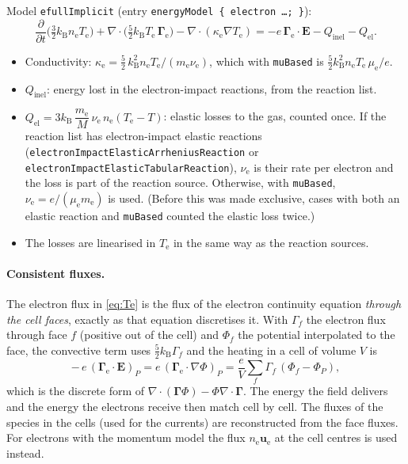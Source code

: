 \documentclass[11pt,a4paper]{article}
\newcommand{\kw}[1]{\texttt{#1}}
\newcommand{\bG}{\boldsymbol{\Gamma}}
\newcommand{\bE}{\mathbf{E}}
\newcommand{\bu}{\mathbf{u}}
\newcommand{\kB}{k_\mathrm{B}}
\newcommand{\Te}{T_\mathrm{e}}
\newcommand{\nel}{n_\mathrm{e}}
\newcommand{\pd}[2]{\frac{\partial #1}{\partial #2}}
\begin{document}
Model \kw{efullImplicit} (entry \kw{energyModel \{ electron \dots; \}}):
\begin{equation}
\pd{}{t}\Big(\tfrac32 \kB \nel \Te\Big)
 + \nabla\cdot\Big(\tfrac52 \kB \Te\,\bG_\mathrm{e}\Big)
 - \nabla\cdot(\kappa_\mathrm{e}\nabla\Te)
 = -e\,\bG_\mathrm{e}\cdot\bE - Q_\mathrm{inel} - Q_\mathrm{el} .
\label{eq:Te}
\end{equation}
\begin{itemize}
\item Conductivity: $\kappa_\mathrm{e} = \tfrac52\,\kB^2 \nel \Te/(m_\mathrm{e}\nu_\mathrm{e})$,
      which with \kw{muBased} is $\tfrac52 \kB^2\nel\Te\,\mu_\mathrm{e}/e$.
\item $Q_\mathrm{inel}$: energy lost in the electron-impact reactions, from
      the reaction list.
\item $Q_\mathrm{el} = 3\kB\,\dfrac{m_\mathrm{e}}{M}\,\nu_\mathrm{e}\,\nel(\Te-T)$:
      elastic losses to the gas, counted once. If the reaction list has
      electron-impact elastic reactions
      (\kw{electronImpactElasticArrheniusReaction} or
      \kw{electronImpactElasticTabularReaction}), $\nu_\mathrm{e}$ is their
      rate per electron and the loss is part of the reaction source.
      Otherwise, with \kw{muBased}, $\nu_\mathrm{e}=e/(\mu_\mathrm{e}m_\mathrm{e})$
      is used. (Before this was made exclusive, cases with both an elastic
      reaction and \kw{muBased} counted the elastic loss twice.)
\item The losses are linearised in $\Te$ in the same way as the reaction
      sources.
\end{itemize}

\paragraph{Consistent fluxes.} The electron flux in \eqref{eq:Te} is the flux
of the electron continuity equation \emph{through the cell faces}, exactly as
that equation discretises it. With $\Gamma_f$ the electron flux through face
$f$ (positive out of the cell) and $\Phi_f$ the potential interpolated to the
face, the convective term uses $\tfrac52\kB\Gamma_f$ and the heating in a cell
of volume $V$ is
\begin{equation}
-\,e\,(\bG_\mathrm{e}\cdot\bE)_P
 = e\,(\bG_\mathrm{e}\cdot\nabla\Phi)_P
 = \frac{e}{V}\sum_f \Gamma_f\,(\Phi_f-\Phi_P) ,
\end{equation}
which is the discrete form of $\nabla\cdot(\bG\Phi)-\Phi\nabla\cdot\bG$. The
energy the field delivers and the energy the electrons receive then match
cell by cell. The fluxes of the species in the cells (used for the currents)
are reconstructed from the face fluxes. For electrons with the momentum model
the flux $\nel\bu_\mathrm{e}$ at the cell centres is used instead.
\end{document}
